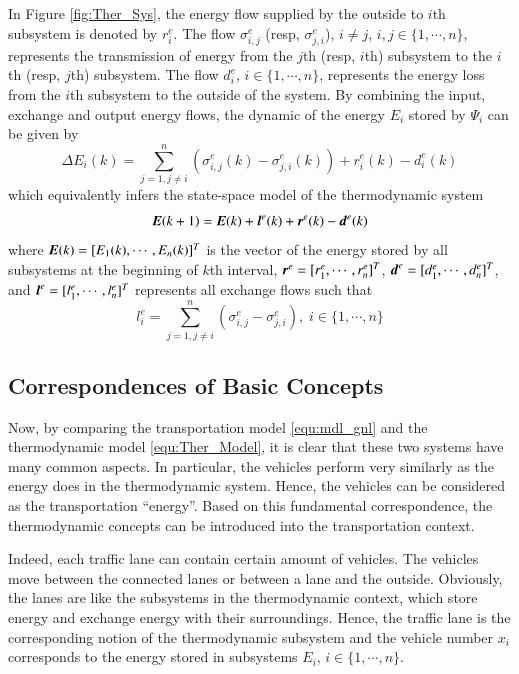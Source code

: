 \documentclass[preprint,authoryear,12pt]{elsarticle}
\renewcommand{\vec}[1]{\mbox{\boldmath$#1$}}
\begin{document}
In Figure \ref{fig:Ther_Sys}, the energy flow supplied by the outside
to $i$th subsystem is denoted by $r^e_i$. The flow $\sigma^e_{i,j}$
(resp, $\sigma^e_{j,i}$), $i\neq j$, $i,j\in \{1,\cdots,n\}$,
represents the transmission of energy from the $j$th (resp, $i$th)
subsystem to the $i$th (resp, $j$th) subsystem. The flow $d^e_i$,
$i\in \{1,\cdots,n\}$, represents the energy loss from the $i$th
subsystem to the outside of the system. By combining the input,
exchange and output energy flows, the dynamic of the energy $E_i$
stored by $\Psi_i$ can be given by
\begin{equation}\label{equ:Ther_Model_SubSystem}
\Delta E_i(k) = \sum_{j=1,j\neq
i}^{n}(\sigma^e_{i,j}(k)-\sigma^e_{j,i}(k))+r^e_i(k)-d^e_i(k)
\end{equation}
which equivalently infers the state-space model of the thermodynamic
system
\begin{equation}\label{equ:Ther_Model}
    \vec{E}(k+1)=\vec{E}(k)+\vec{l}^e(k)+\vec{r}^e(k)-\vec{d}^e(k)
\end{equation}
where $\vec{E}(k)=[E_1(k),\cdots,E_n(k)]^T$ is the vector of the
energy stored by all subsystems at the beginning of $k$th interval,
$\vec{r}^e=[r^e_1,\cdots,r^e_n]^T$,
$\vec{d}^e=[d^e_{1},\cdots,d^e_{n}]^T$, and
$\vec{l}^e=[l^e_1,\cdots,l^e_n]^T$ represents all exchange flows such
that
\begin{equation*}
l^e_i = \sum_{j=1,j\neq i}^{n}
        (\sigma^e_{i,j}-\sigma^e_{j,i}),
\; i\in \{1,\cdots,n\}
\end{equation*}

\subsection{Correspondences of Basic Concepts}

Now, by comparing the transportation model \eqref{equ:mdl_gnl} and
the thermodynamic model \eqref{equ:Ther_Model}, it is clear that
these two systems have many common aspects. In particular, the
vehicles perform very similarly as the energy does in the
thermodynamic system. Hence, the vehicles can be considered as the
transportation ``energy''. Based on this fundamental correspondence,
the thermodynamic concepts can be introduced into the transportation
context.

Indeed, each traffic lane can contain certain amount of vehicles. The
vehicles move between the connected lanes or between a lane and the
outside. Obviously, the lanes are like the subsystems in the
thermodynamic context, which store energy and exchange energy with
their surroundings. Hence, the traffic lane is the corresponding
notion of the thermodynamic subsystem and the vehicle number $x_i$
corresponds to the energy stored in subsystems $E_i$,
$i\in\{1,\cdots,n\}$.
\end{document}
